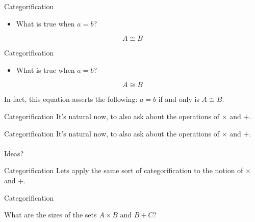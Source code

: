 \documentclass[tikz]{beamer}
\theoremstyle{definition}
\begin{document}
\begin{frame}{Categorification}
    \begin{block}{}
        \begin{itemize}
            \item What is true when $a = b$?
        \end{itemize}

        \begin{equation*}
            A \cong B
        \end{equation*}
    \end{block}
    

\end{frame}

\begin{frame}{Categorification}
    \begin{block}{}
        \begin{itemize}
            \item What is true when $a = b$?
        \end{itemize}

        \begin{equation*}
            A \cong B
        \end{equation*}
    \end{block}
    In fact, this equation asserts the following: $a = b$ if and only is $A \cong B$.
\end{frame}{}

\begin{frame}{Categorification}
    It's natural now, to also ask about the operations of $\times$ and $+$.
\end{frame}{}

\begin{frame}{Categorification}
    It's natural now, to also ask about the operations of $\times$ and $+$.
    \\
    \\Ideas?
\end{frame}{}

\begin{frame}{Categorification}
    Lets apply the same sort of categorification to the notion of $\times$ and +. 
    
\end{frame}{}

\begin{frame}{Categorification}

What are the sizes of the sets $A \times B$ and $B + C$?
    
\end{frame}{}
\end{document}
